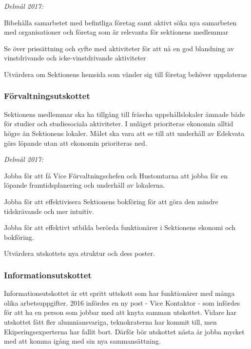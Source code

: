 \documentclass[../_main/handlingar.tex]{subfiles}
\begin{document}
\emph{Delmål 2017:}
\begin{dashlist}
    \item Bibehålla samarbetet med befintliga företag samt aktivt söka nya samarbeten med organisationer och företag som är relevanta för sektionens medlemmar
    \item Se över prissättning och syfte med aktiviteter för att nå en god blandning av vinstdrivande och icke-vinstdrivande aktiviteter
    \item Utvärdera om Sektionens hemsida som vänder sig till företag behöver uppdateras
\end{dashlist}

\subsubsection*{Förvaltningsutskottet}
Sektionens medlemmar ska ha tillgång till fräscha uppehållslokaler ämnade både för studier och studiesociala aktiviteter. I nuläget prioriteras ekonomin alltid högre än Sektionens lokaler. Målet ska vara att se till att underhåll av Edekvata görs löpande utan att ekonomin prioriteras ned.

\emph{Delmål 2017:}
\begin{dashlist}
    \item Jobba för att få Vice Förvaltningschefen och Hustomtarna att jobba för en löpande framtidsplanering och underhåll av lokalerna.
    \item Jobba för att effektivisera Sektionens bokföring för att göra den mindre tidskrävande och mer intuitiv.
    \item Jobba för att effektivt utbilda berörda funktionärer i Sektionens ekonomi och bokföring.
    \item Utvärdera utskottets nya struktur och dess poster.
\end{dashlist}

\newpage

\subsubsection*{Informationsutskottet}
Informationsutskottet är ett spritt uttskott som har funktionärer med många olika arbetsuppgifter. 2016 infördes en ny post - Vice Kontaktor - som infördes för att ha en person som jobbar med att knyta samman utskottet. Vidare har utskottet fått fler alumniansvariga, teknokraterna har kommit till, men Ekiperingsexperterna har fallit bort. Därför bör utskottet nästa år jobba mycket med att komma igång med sin nya sammansättning.
\end{document}
